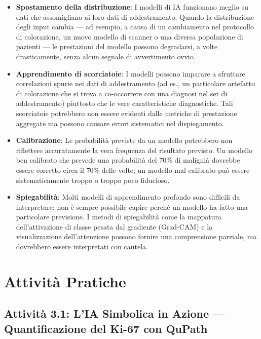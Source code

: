 \begin{itemize}
    \item \textbf{Spostamento della distribuzione}: I modelli di IA funzionano meglio su dati che assomigliano ai loro dati di addestramento. Quando la distribuzione degli input cambia — ad esempio, a causa di un cambiamento nel protocollo di colorazione, un nuovo modello di scanner o una diversa popolazione di pazienti — le prestazioni del modello possono degradarsi, a volte drasticamente, senza alcun segnale di avvertimento ovvio.

    \item \textbf{Apprendimento di scorciatoie}: I modelli possono imparare a sfruttare correlazioni spurie nei dati di addestramento (ad es., un particolare artefatto di colorazione che si trova a co-occorrere con una diagnosi nel set di addestramento) piuttosto che le vere caratteristiche diagnostiche. Tali scorciatoie potrebbero non essere evidenti dalle metriche di prestazione aggregate ma possono causare errori sistematici nel dispiegamento.

    \item \textbf{Calibrazione}: Le probabilità previste da un modello potrebbero non riflettere accuratamente la vera frequenza del risultato previsto. Un modello ben calibrato che prevede una probabilità del 70\% di malignià dovrebbe essere corretto circa il 70\% delle volte; un modello mal calibrato può essere sistematicamente troppo o troppo poco fiducioso.

    \item \textbf{Spiegabilità}: Molti modelli di apprendimento profondo sono difficili da interpretare: non è sempre possibile capire perché un modello ha fatto una particolare previsione. I metodi di spiegabilità come la mappatura dell'attivazione di classe pesata dal gradiente (Grad-CAM) e la visualizzazione dell'attenzione possono fornire una comprensione parziale, ma dovrebbero essere interpretati con cautela.
\end{itemize}

\section{Attività Pratiche}
\label{sec:ch3_practical}

\subsection{Attività 3.1: L'IA Simbolica in Azione --- Quantificazione del Ki-67 con QuPath}


